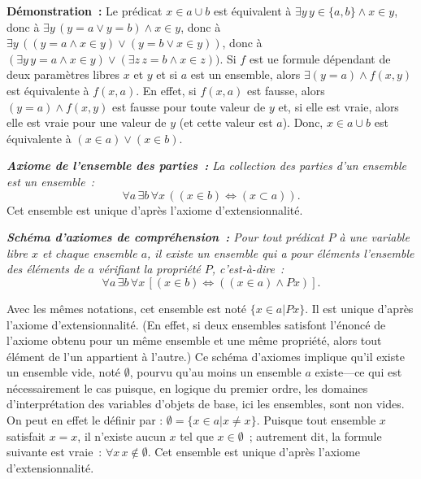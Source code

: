 \medskip

\noindent\textbf{Démonstration :} 
    Le prédicat $x \in a \cup b$ est équivalent à $\exists y \, y \in \lbrace a, b \rbrace \wedge x \in y$, donc à $\exists y \, (y = a \vee y = b) \wedge x \in y$, donc à $\exists y \, ((y = a \wedge x \in y) \vee (y = b \vee x \in y))$, donc à $(\exists y \, y = a \wedge x \in y) \vee (\exists z \, z = b \wedge x \in z))$.
    Si $f$ est ue formule dépendant de deux paramètres libres $x$ et $y$ et si $a$ est un ensemble, alors $\exists (y = a) \wedge f(x,y)$ est équivalente à $f(x,a)$.
    En effet, si $f(x,a)$ est fausse, alors $(y = a) \wedge f(x,y)$ est fausse pour toute valeur de $y$ et, si elle est vraie, alors elle est vraie pour une valeur de $y$ (et cette valeur est $a$). 
    Donc, $x \in a \cup b$ est équivalente à $(x \in a) \vee (x \in b)$.

    \done

\medskip

\noindent\textit{\textbf{Axiome de l'ensemble des parties :} La collection des parties d'un ensemble est un ensemble :} 
\begin{equation*}
    \forall a \, \exists b \, \forall x \, (
        (x \in b) \Leftrightarrow (x \subset a)
    ).
\end{equation*}
Cet ensemble est unique d'après l'axiome d'extensionnalité.

\medskip

\noindent\textit{\textbf{Schéma d'axiomes de compréhension :} 
Pour tout prédicat $P$ à une variable libre $x$ et chaque ensemble $a$, il existe un ensemble qui a pour éléments l'ensemble des éléments de $a$ vérifiant la propriété $P$, c'est-à-dire :}
\begin{equation*}
\forall a \, \exists b \, \forall x \, [ (x \in b) \Leftrightarrow ((x \in a) \wedge P x)]. 
\end{equation*}

Avec les mêmes notations, cet ensemble est noté $\lbrace x \in a \vert P x \rbrace$. 
Il est unique d'après l'axiome d'extensionnalité. 
(En effet, si deux ensembles satisfont l'énoncé de l'axiome obtenu pour un même ensemble et une même propriété, alors tout élément de l'un appartient à l'autre.)
Ce schéma d'axiomes implique qu'il existe un ensemble vide, noté $\emptyset$, pourvu qu'au moins un ensemble $a$ existe—ce qui est nécessairement le cas puisque, en logique du premier ordre, les domaines d'interprétation des variables d'objets de base, ici les ensembles, sont non vides. 
On peut en effet le définir par : $\emptyset = \lbrace x \in a \vert x \neq x \rbrace$. 
Puisque tout ensemble $x$ satisfait $x = x$, il n'existe aucun $x$ tel que $x \in \emptyset$ ; autrement dit, la formule suivante est vraie : $\forall x \, x \notin \emptyset$. 
Cet ensemble est unique d'après l'axiome d'extensionnalité.

